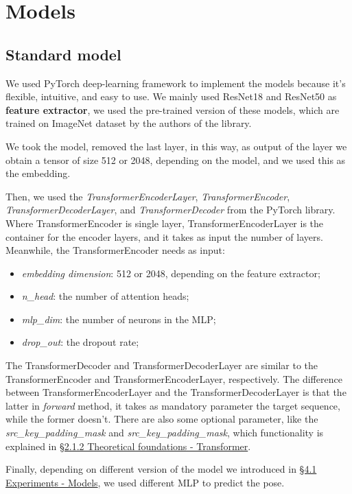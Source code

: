 \section{Models}\label{sec:models}

\subsection{Standard model}\label{subsec:standard-model}
We used PyTorch deep-learning framework to implement the models because it's flexible, intuitive, and easy to use.
We mainly used ResNet18 and ResNet50 as \textbf{feature extractor}, we used the pre-trained version of these models, which are trained on ImageNet dataset by the authors of the library.

We took the model, removed the last layer, in this way, as output of the layer we obtain a tensor of size 512 or 2048, depending on the model, and we used this as the embedding.

Then, we used the \textit{TransformerEncoderLayer}, \textit{TransformerEncoder}, \textit{TransformerDecoderLayer}, and \textit{TransformerDecoder} from the PyTorch library.
Where TransformerEncoder is single layer, TransformerEncoderLayer is the container for the encoder layers, and it takes as input the number of layers.
Meanwhile, the TransformerEncoder needs as input:
\begin{itemize}
    \item \textit{embedding dimension}: 512 or 2048, depending on the feature extractor;
    \item \textit{n\_head}: the number of attention heads;
    \item \textit{mlp\_dim}: the number of neurons in the MLP;
    \item \textit{drop\_out}: the dropout rate;
\end{itemize}
The TransformerDecoder and TransformerDecoderLayer are similar to the TransformerEncoder and TransformerEncoderLayer, respectively.
The difference between TransformerEncoderLayer and the TransformerDecoderLayer is that the latter in \textit{forward} method, it takes as mandatory parameter the target sequence, while the former doesn't.
There are also some optional parameter, like the \textit{src\_key\_padding\_mask} and \textit{src\_key\_padding\_mask}, which functionality is explained in \hyperref[subsec:transformer]{\S2.1.2 Theoretical foundations - Transformer}.

Finally, depending on different version of the model we introduced in \hyperref[subsec:models]{\S4.1 Experiments - Models}, we used different MLP to predict the pose.

